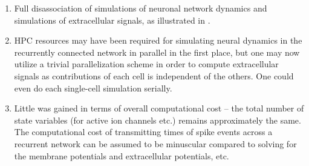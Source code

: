 \begin{enumerate}
\item Full disassociation of simulations of neuronal network dynamics and simulations of extracellular signals,
as illustrated in .
\item HPC resources may have been required for simulating neural dynamics in the recurrently connected network in parallel in the first place,
but one may now utilize a trivial parallelization scheme in order to compute extracellular signals as contributions of each cell is independent of the others.
One could even do each single-cell simulation serially.
\item Little was gained in terms of overall computational cost -- the total number of state variables (for active ion channels etc.) remains approximately the same.
The computational cost of transmitting times of spike events across a recurrent network can be assumed to be minuscular compared to solving for the membrane potentials and extracellular potentials, etc.
\end{enumerate}

